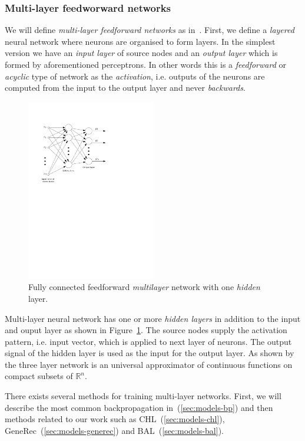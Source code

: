 \subsubsection{Multi-layer feedworward networks} 
\label{sec:theory-multilayer} 

We will define \emph{multi-layer feedforward networks} as in~\citet{haykin1994neural}. First, we define a \emph{layered} neural network where neurons are organised to form layers. In the simplest version we have an \emph{input layer} of source nodes and an \emph{output layer} which is formed by aforementioned perceptrons. In other words this is a \emph{feedforward} or \emph{acyclic} type of network as the \emph{activation}, i.e. outputs of the neurons are computed from the input to the output layer and never \emph{backwards}. 

\begin{figure}[h]
  \centering
  \includegraphics[width=0.5\textwidth]{img/multilayer.pdf}    
  \caption{Fully connected feedforward \emph{multilayer} network with one \emph{hidden} layer. } 
  \label{fig:multilayer}
\end{figure}

Multi-layer neural network has one or more \emph{hidden layers} in addition to the input and ouput layer as shown in Figure~\ref{fig:multilayer}. The source nodes supply the activation pattern, i.e. input vector, which is applied to next layer of neurons. The output signal of the hidden layer is used as the input for the output layer. As shown by~\citet{cybenko1989approximation} the three layer network is an universal approximator of continuous functions on compact subsets of $\mathbb{R}^n$.

There exists several methods for training multi-layer networks. First, we will describe the most common backpropagation in~(\ref{sec:models-bp}) and then methods related to our work such as CHL~(\ref{sec:models-chl}), GeneRec~(\ref{sec:models-generec}) and BAL~(\ref{sec:models-bal}). 
